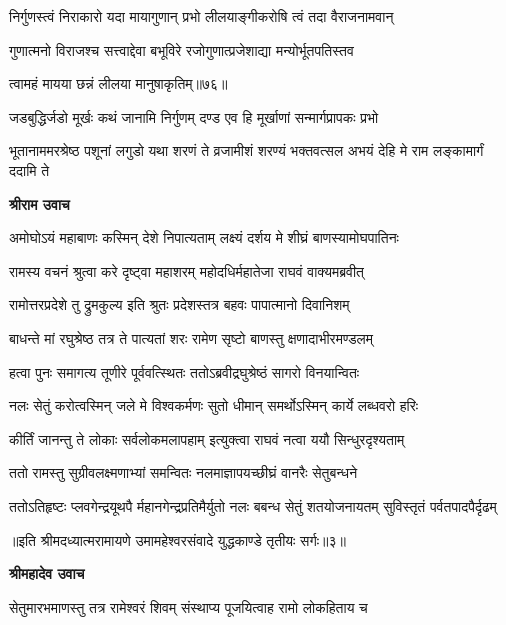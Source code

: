 \twolineshloka
{निर्गुणस्त्वं निराकारो यदा मायागुणान् प्रभो}
{लीलयाङ्गीकरोषि त्वं तदा वैराजनामवान्} %

\twolineshloka
{गुणात्मनो विराजश्च सत्त्वाद्देवा बभूविरे}
{रजोगुणात्प्रजेशाद्या मन्योर्भूतपतिस्तव} %

{त्वामहं मायया छन्नं लीलया मानुषाकृतिम्॥७६॥} %


\twolineshloka
{जडबुद्धिर्जडो मूर्खः कथं जानामि निर्गुणम्}
{दण्ड एव हि मूर्खाणां सन्मार्गप्रापकः प्रभो} %

\threelineshloka
{भूतानाममरश्रेष्ठ पशूनां लगुडो यथा}
{शरणं ते व्रजामीशं शरण्यं भक्तवत्सल}
{अभयं देहि मे राम लङ्कामार्गं ददामि ते} %

\textbf{श्रीराम उवाच}

\twolineshloka
{अमोघोऽयं महाबाणः कस्मिन् देशे निपात्यताम्}
{लक्ष्यं दर्शय मे शीघ्रं बाणस्यामोघपातिनः} %

\twolineshloka
{रामस्य वचनं श्रुत्वा करे दृष्ट्वा महाशरम्}
{महोदधिर्महातेजा राघवं वाक्यमब्रवीत्} %

\twolineshloka
{रामोत्तरप्रदेशे तु द्रुमकुल्य इति श्रुतः}
{प्रदेशस्तत्र बहवः पापात्मानो दिवानिशम्} %

\twolineshloka
{बाधन्ते मां रघुश्रेष्ठ तत्र ते पात्यतां शरः}
{रामेण सृष्टो बाणस्तु क्षणादाभीरमण्डलम्} %

\twolineshloka
{हत्वा पुनः समागत्य तूणीरे पूर्ववत्स्थितः}
{ततोऽब्रवीद्रघुश्रेष्ठं सागरो विनयान्वितः} %

\twolineshloka
{नलः सेतुं करोत्वस्मिन् जले मे विश्वकर्मणः}
{सुतो धीमान् समर्थोऽस्मिन् कार्ये लब्धवरो हरिः} %

\twolineshloka
{कीर्तिं जानन्तु ते लोकाः सर्वलोकमलापहाम्}
{इत्युक्त्वा राघवं नत्वा ययौ सिन्धुरदृश्यताम्} %

\twolineshloka
{ततो रामस्तु सुग्रीवलक्ष्मणाभ्यां समन्वितः}
{नलमाज्ञापयच्छीघ्रं वानरैः सेतुबन्धने} %

\fourlineindentedshloka
{ततोऽतिहृष्टः प्लवगेन्द्रयूथपै\-}
{र्महानगेन्द्रप्रतिमैर्युतो नलः}
{बबन्ध सेतुं शतयोजनायतम्}
{सुविस्तृतं पर्वतपादपैर्दृढम्} %

{॥इति श्रीमदध्यात्मरामायणे उमामहेश्वरसंवादे युद्धकाण्डे
तृतीयः सर्गः॥३॥
}




\textbf{श्रीमहादेव उवाच}

\twolineshloka
{सेतुमारभमाणस्तु तत्र रामेश्वरं शिवम्}
{संस्थाप्य पूजयित्वाह रामो लोकहिताय च} %

